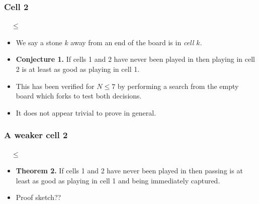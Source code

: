 \documentclass{beamer}
\begin{document}
    \begin{frame}
        \frametitle{Cell 2}
        \begin{center}
            \cleargoban
            \showgoban[b2,k2]\ \ $\leq$
            \cleargoban
            \showgoban[b2,k2]
        \end{center}
        \begin{itemize}
            \item We say a stone $k$ away from an end of the board is in \textit{cell $k$}.
            \item \textbf{Conjecture 1.} If cells 1 and 2 have never been played
                in then playing in cell 2 is at least as good as playing in cell 1.
            \pause
            \item This has been verified for $N \leq 7$ by performing a search from the empty board which forks
                to test both decisions.
            \item It does not appear trivial to prove in general.
        \end{itemize}
    \end{frame}

    \begin{frame}
        \frametitle{A weaker cell 2}
        \begin{center}
            \cleargoban
            \showgoban[b2,k2]\ \ $\leq$
            \cleargoban
            \showgoban[b2,k2]
        \end{center}
        \begin{itemize}
            \item \textbf{Theorem 2.} If cells 1 and 2 have never been played
                in then passing is at least as good as playing in cell 1 and being immediately captured.
            \pause
            \item Proof sketch??
        \end{itemize}
    \end{frame}
\end{document}
